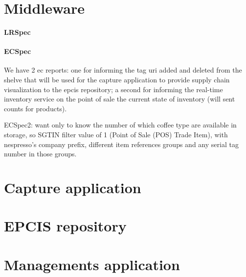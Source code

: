 \section{Middleware}



\paragraph{LRSpec}

\paragraph{ECSpec}

We have 2 ec reports: one for informing the tag uri added and deleted from the shelve that will be used for the capture application to provide supply chain visualization to the epcis repository; a second for informing the real-time inventory service on the point of sale the current state of inventory (will sent counts for products).

ECSpec2: want only to know the number of which coffee type are available in storage, so SGTIN filter value of 1 (Point of Sale (POS) Trade Item), with nespresso's company prefix, different item references groups and any serial tag number in those groups.


\section{Capture application}

\section{EPCIS repository}

\section{Managements application}